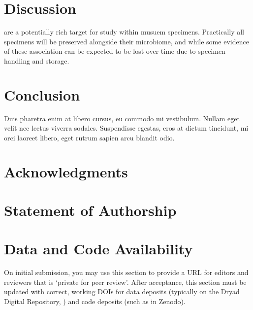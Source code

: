 \documentclass[11pt]{article}
\begin{document}
	\section*{Discussion}
	
are a potentially rich target for study within musuem specimens\citep{}. Practically all specimens will be preserved alongside their microbiome, and while some evidence of these association can be expected to be lost over time due to specimen handling and storage. 

	
	\section*{Conclusion}
	
	Duis pharetra enim at libero cursus, eu commodo mi vestibulum. Nullam eget velit nec lectus viverra sodales. Suspendisse egestas, eros at dictum tincidunt, mi orci laoreet libero, eget rutrum sapien arcu blandit odio.
	
	
	\section*{Acknowledgments}


	
	\section*{Statement of Authorship}
	

	
	\section*{Data and Code Availability}
	
	On initial submission, you may use this section to provide a URL for editors and reviewers that is `private for peer review'. After acceptance, this section must be updated with correct, working DOIs for data deposits (typically on the Dryad Digital Repository, \citealt{CookEtAl2015}) and code deposits (such as in Zenodo). 
	
\end{document}
